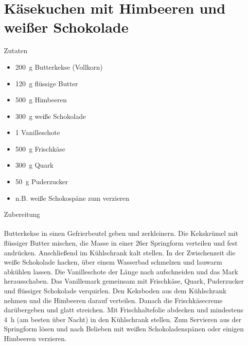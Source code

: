 \section*{Käsekuchen mit Himbeeren und weißer Schokolade}
\ihead{}\ohead{}
\cfoot{}
{\Large Zutaten}
\begin{multicols}{2}
\begin{itemize}
    \item \SI{200}{g} Butterkekse (Vollkorn)
    \item \SI{120}{g} flüssige Butter
    \item \SI{500}{g} Himbeeren
    \item \SI{300}{g} weiße Schokolade
    \item \num{1} Vanilleschote
    \item \SI{500}{g} Frischkäse
    \item \SI{300}{g} Quark
    \item \SI{50}{g} Puderzucker
    \item n.B. weiße Schokospäne zum verzieren
\end{itemize}
\end{multicols}
\noindent
{\Large Zubereitung}\\
\\
Butterkekse in einen Gefrierbeutel geben und zerkleinern.
Die Kekskrümel mit flüssiger Butter mischen, die Masse in einer \num{26}er Springform verteilen und fest andrücken.
Anschließend im Kühlschrank kalt stellen.
In der Zwischenzeit die weiße Schokolade hacken, über einem Wasserbad schmelzen und lauwarm abkühlen lassen.
Die Vanilleschote der Länge nach aufschneiden und das Mark herausschaben.
Das Vanillemark gemeinsam mit Frischkäse, Quark, Puderzucker und flüssiger Schokolade verquirlen.
Den Keksboden aus dem Kühlschrank nehmen und die Himbeeren darauf verteilen.
Danach die Frischkäsecreme darübergeben und glatt streichen.
Mit Frischhaltefolie abdecken und mindestens \SI{4}{h} (am besten über Nacht) in den Kühlschrank stellen.
Zum Servieren aus der Springform lösen und nach Belieben mit weißen Schokoladenspänen oder einigen Himbeeren verzieren.